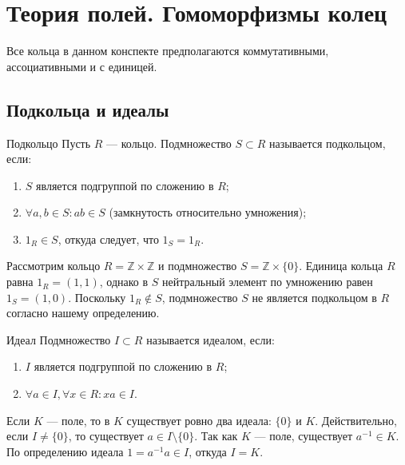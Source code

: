 
\section{Теория полей. Гомоморфизмы колец}

\begin{Remark}{}{}
	Все кольца в данном конспекте предполагаются коммутативными, ассоциативными и с единицей.
\end{Remark}

\subsection{Подкольца и идеалы}

\begin{Definition}{Подкольцо}{}
	Пусть $R$ --- кольцо. Подмножество $S \subset R$ называется подкольцом, если:
	\begin{enumerate}
		\item $S$ является подгруппой по сложению в $R$;
		\item $\forall a, b \in S \colon ab \in S$ (замкнутость относительно умножения);
		\item $1_R \in S$, откуда следует, что $1_S = 1_R$.
	\end{enumerate}
\end{Definition}

\begin{Example}{}{}
	Рассмотрим кольцо $R = \mathbb{Z} \times \mathbb{Z}$ и подмножество $S = \mathbb{Z} \times \{0\}$. 
	Единица кольца $R$ равна $1_R = (1, 1)$, однако в $S$ нейтральный элемент по умножению равен $1_S = (1, 0)$. Поскольку $1_R \notin S$, подмножество $S$ не является подкольцом в $R$ согласно нашему определению.
\end{Example}

\begin{Definition}{Идеал}{}
	Подмножество $I \subset R$ называется идеалом, если:
	\begin{enumerate}
		\item $I$ является подгруппой по сложению в $R$;
		\item $\forall a \in I, \forall x \in R \colon xa \in I$.
	\end{enumerate}
\end{Definition}

\begin{Remark}{}{}
	Если $K$ --- поле, то в $K$ существует ровно два идеала: $\{0\}$ и $K$. 
	Действительно, если $I \neq \{0\}$, то существует $a \in I \setminus \{0\}$. Так как $K$ --- поле, существует $a^{-1} \in K$. По определению идеала $1 = a^{-1}a \in I$, откуда $I = K$.
\end{Remark}

